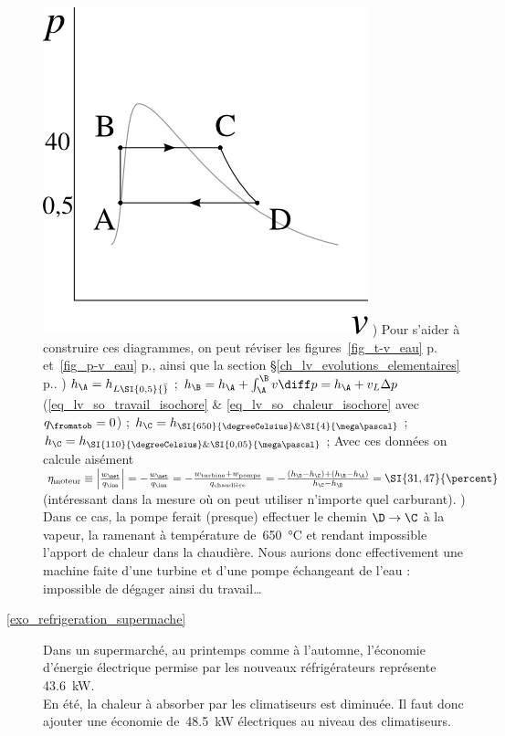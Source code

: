 \begin{description}
			\includegraphics[height=\solutiondiagramwidth]{images/exo_sol_pv_moteur_vapeur.png}
			) Pour s’aider à construire ces diagrammes, on peut réviser les figures~\ref{fig_t-v_eau} p.\pageref{fig_t-v_eau} et~\ref{fig_p-v_eau} p.\pageref{fig_p-v_eau}, ainsi que la section \S\ref{ch_lv_evolutions_elementaires} p.\pageref{ch_lv_evolutions_elementaires}.
			)	$h_\A = h_{L \SI{0,5}{\bar}}$ ;
						$h_\B = h_\A + \int_\A^\B v \diff p = h_\A + v_L \Delta p $ (\ref{eq_lv_so_travail_isochore} \& \ref{eq_lv_so_chaleur_isochore} avec $q_\fromatob = 0$) ;
						$h_\C = h_{\SI{650}{\degreeCelsius} \& \SI{4}{\mega\pascal}}$ ;
						$h_\C = h_{\SI{110}{\degreeCelsius} \& \SI{0,05}{\mega\pascal}}$ ;
						Avec ces données on calcule aisément $\eta_\text{moteur} \equiv \left|\frac{w_\net}{q_\inn}\right| = -\frac{w_\net}{q_\inn} = -\frac{w_\text{turbine} + w_\text{pompe}}{q_\text{chaudière}} = -\frac{(h_\D - h_\C) + (h_\B - h_\A)}{h_\C - h_\B} = \SI{31,47}{\percent}$ (intéressant dans la mesure où on peut utiliser n’importe quel carburant).
			\tab{}) Dans ce cas, la pompe ferait (presque) effectuer le chemin $\D \to \C$ à la vapeur, la ramenant à température de~\SI{650}{\degreeCelsius} et rendant impossible l’apport de chaleur dans la chaudière. Nous aurions donc effectivement une machine faite d’une turbine et d’une pompe échangeant de l’eau : impossible de dégager ainsi du travail…
	\item [\ref{exo_refrigeration_supermache}]
			\tab Dans un supermarché, au printemps comme à l’automne, l’économie d’énergie électrique permise par les nouveaux réfrigérateurs représente \SI{43,6}{\kilo\watt}.\\
			En été, la chaleur à absorber par les climatiseurs est diminuée. Il faut donc ajouter une économie de~\SI{48,5}{\kilo\watt} électriques au niveau des climatiseurs.\\

\end{description}
